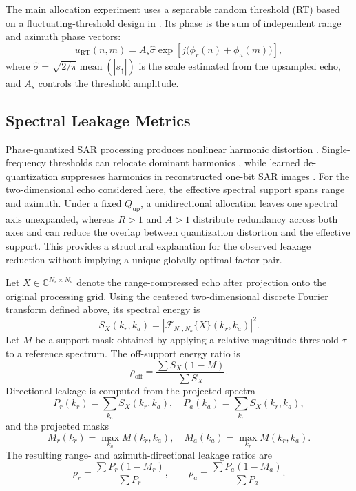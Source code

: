 \documentclass[conference]{IEEEtran}
\begin{document}
The main allocation experiment uses a separable random threshold (RT) based on a fluctuating-threshold design in \cite{nie2025fixed}. Its phase is the sum of independent range and azimuth phase vectors:
\begin{equation}
    u_{\mathrm{RT}}(n,m)
    =A_s\hat{\sigma}\exp\!\left[j\bigl(\phi_r(n)+\phi_a(m)\bigr)\right],
\end{equation}
where $\hat{\sigma}=\sqrt{2/\pi}\operatorname{mean}(|s_{\uparrow}|)$ is the scale estimated from the upsampled echo, and $A_s$ controls the threshold amplitude.

\subsection{Spectral Leakage Metrics}

Phase-quantized SAR processing produces nonlinear harmonic distortion \cite{franceschetti1999phase}. Single-frequency thresholds can relocate dominant harmonics \cite{zhao2019onebit}, while learned de-quantization suppresses harmonics in reconstructed one-bit SAR images \cite{si2023dequantization}. For the two-dimensional echo considered here, the effective spectral support spans range and azimuth. Under a fixed $Q_{\mathrm{up}}$, a unidirectional allocation leaves one spectral axis unexpanded, whereas $R>1$ and $A>1$ distribute redundancy across both axes and can reduce the overlap between quantization distortion and the effective support. This provides a structural explanation for the observed leakage reduction without implying a unique globally optimal factor pair.

Let $X\in\mathbb{C}^{N_r\times N_a}$ denote the range-compressed echo after projection onto the original processing grid. Using the centered two-dimensional discrete Fourier transform defined above, its spectral energy is
\begin{equation}
    S_X(k_r,k_a)=|\mathcal{F}_{N_r,N_a}\{X\}(k_r,k_a)|^2.
\end{equation}
Let $M$ be a support mask obtained by applying a relative magnitude threshold $\tau$ to a reference spectrum. The off-support energy ratio is
\begin{equation}
    \rho_{\mathrm{off}}
    =\frac{\sum S_X(1-M)}{\sum S_X}.
\end{equation}
Directional leakage is computed from the projected spectra
\begin{equation}
    P_r(k_r)=\sum_{k_a}S_X(k_r,k_a),\quad
    P_a(k_a)=\sum_{k_r}S_X(k_r,k_a),
\end{equation}
and the projected masks
\begin{equation}
    M_r(k_r)=\max_{k_a}M(k_r,k_a),\quad
    M_a(k_a)=\max_{k_r}M(k_r,k_a).
\end{equation}
The resulting range- and azimuth-directional leakage ratios are
\begin{equation}
    \rho_r=\frac{\sum P_r(1-M_r)}{\sum P_r},\qquad
    \rho_a=\frac{\sum P_a(1-M_a)}{\sum P_a}.
\end{equation}
\end{document}
